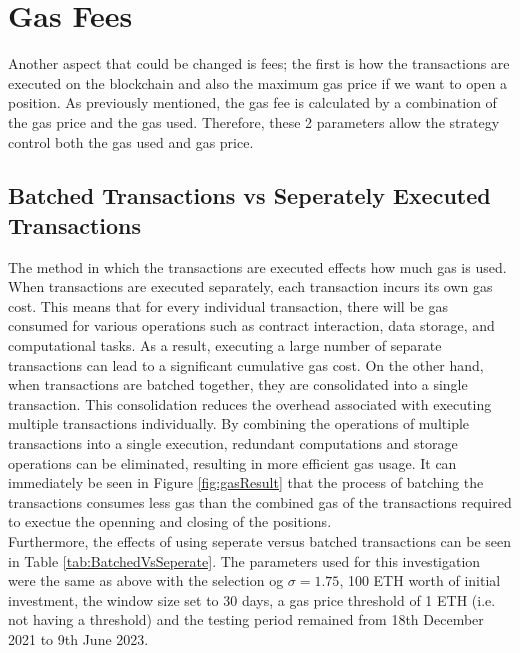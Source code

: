 \section{Gas Fees}
Another aspect that could be changed is fees; the first is how the transactions are executed on the blockchain and also the maximum gas price if we want to open a position. As previously mentioned, the gas fee is calculated by a combination of the gas price and the gas used. Therefore, these 2 parameters allow the strategy control both the gas used and gas price.

\subsection{Batched Transactions vs Seperately Executed Transactions}
The method in which the transactions are executed effects how much gas is used. When transactions are executed separately, each transaction incurs its own gas cost. This means that for every individual transaction, there will be gas consumed for various operations such as contract interaction, data storage, and computational tasks. As a result, executing a large number of separate transactions can lead to a significant cumulative gas cost. On the other hand, when transactions are batched together, they are consolidated into a single transaction. This consolidation reduces the overhead associated with executing multiple transactions individually. By combining the operations of multiple transactions into a single execution, redundant computations and storage operations can be eliminated, resulting in more efficient gas usage. It can immediately be seen in Figure  \ref{fig:gasResult} that the process of batching the transactions consumes less gas than the combined gas of the transactions required to exectue the openning and closing of the positions.
\\[5mm]
Furthermore, the effects of using seperate versus batched transactions can be seen in Table \ref{tab:BatchedVsSeperate}. The parameters used for this investigation were the same as above with the selection og $\sigma = 1.75$, 100 ETH worth of initial investment, the window size set to 30 days, a gas price threshold of 1 ETH (i.e. not having a threshold) and the testing period remained from 18th December 2021 to 9th June 2023.

